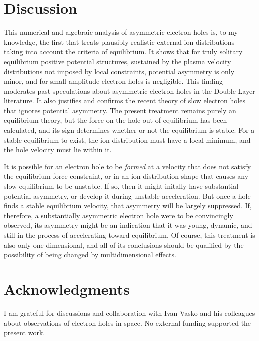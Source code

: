 \documentclass[12pt]{article}
\begin{document}
\section{Discussion}

This numerical and algebraic analysis of asymmetric electron holes is,
to my knowledge, the first that treats plausibly realistic external
ion distributions taking into account the criteria of equilibrium. It
shows that for truly solitary equilibrium positive potential
structures, sustained by the plasma velocity distributions not imposed by local
constraints, potential asymmetry is only minor, and for small
amplitude electron holes is negligible.  This finding moderates past
speculations about asymmetric electron holes in the Double Layer
literature. It also justifies and confirms the recent
theory\cite{Hutchinson2021c} of slow electron holes that ignores
potential asymmetry. The present treatment remains purely an
equilibrium theory, but the force on the hole out of equilibrium has
been calculated, and its sign determines whether or not the equilibrium
is stable. For a stable equilibrium to exist, the ion distribution
must have a local minimum, and the hole velocity must lie within it.

It is possible for an electron hole to be \emph{formed} at a velocity
that does not satisfy the equilibrium force constraint, or in an ion
distribution shape that causes any slow equilibrium to be unstable. If
so, then it might initally have substantial potential asymmetry, or
develop it during unstable acceleration. But once a hole finds a stable
equilibrium velocity, that asymmetry will be largely suppressed. If,
therefore, a substantially asymmetric electron hole were to be
convincingly observed, its asymmetry might be an indication that it
was young, dynamic, and still in the process of accelerating toward
equilibrium. Of course, this treatment is also only one-dimensional,
and all of its conclusions should be qualified by the possibility of
being changed by multidimensional effects.

\section*{Acknowledgments}
I am grateful for discussions and collaboration with Ivan Vasko and
his colleagues about observations of electron holes in space. No
external funding supported the present work.


\end{document}
